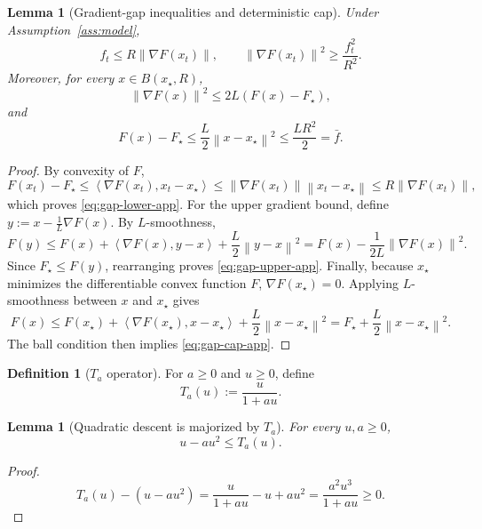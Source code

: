 \documentclass{article}
\newtheorem{lemma}[theorem]{Lemma}
\theoremstyle{definition}
\newtheorem{definition}[theorem]{Definition}
\newcommand{\norm}[1]{\left\lVert #1\right\rVert}
\newcommand{\ip}[2]{\left\langle #1,#2\right\rangle}
\begin{document}
\begin{lemma}[Gradient-gap inequalities and deterministic cap]
\label{lem:gap}
Under Assumption~\ref{ass:model},
\begin{equation}
f_t\le R\norm{\nabla F(x_t)},
\qquad
\norm{\nabla F(x_t)}^2\ge \frac{f_t^2}{R^2}.
\label{eq:gap-lower-app}\end{equation}
Moreover, for every $x\in B(x_\star,R)$,
\begin{equation}
\norm{\nabla F(x)}^2\le 2L(F(x)-F_\star),
\label{eq:gap-upper-app}\end{equation}
and
\begin{equation}
F(x)-F_\star\le \frac{L}{2}\norm{x-x_\star}^2\le \frac{LR^2}{2}=\bar f.
\label{eq:gap-cap-app}\end{equation}
\end{lemma}

\begin{proof}
By convexity of $F$,
\[
F(x_t)-F_\star
\le
\ip{\nabla F(x_t)}{x_t-x_\star}
\le
\norm{\nabla F(x_t)}\norm{x_t-x_\star}
\le
R\norm{\nabla F(x_t)},
\]
which proves \eqref{eq:gap-lower-app}. For the upper gradient bound, define $
y:=x-\frac1L\nabla F(x)$.
By $L$-smoothness,
\[
F(y)\le F(x)+\ip{\nabla F(x)}{y-x}+\frac{L}{2}\norm{y-x}^2
=
F(x)-\frac1{2L}\norm{\nabla F(x)}^2.
\]
Since $F_\star\le F(y)$, rearranging proves \eqref{eq:gap-upper-app}.
Finally, because $x_\star$ minimizes the differentiable convex function $F$,
$\nabla F(x_\star)=0$. Applying $L$-smoothness between $x$ and $x_\star$ gives
\[
F(x)\le F(x_\star)+\ip{\nabla F(x_\star)}{x-x_\star}+\frac{L}{2}\norm{x-x_\star}^2
=
F_\star+\frac{L}{2}\norm{x-x_\star}^2.
\]
The ball condition then implies \eqref{eq:gap-cap-app}.
\end{proof}

\begin{definition}[$T_a$ operator]
For $a\ge 0$ and $u\ge 0$, define
\begin{equation}
T_a(u):=\frac{u}{1+a u}.\end{equation}
\end{definition}

\begin{lemma}[Quadratic descent is majorized by $T_a$]
\label{lem:Ta-majorizes}
For every $u,a\ge 0$,
\[
u-a u^2\le T_a(u).\]
\end{lemma}

\begin{proof}
\[
T_a(u)-(u-a u^2)
=
\frac{u}{1+a u}-u+a u^2
=
\frac{a^2u^3}{1+a u}\ge 0.
\]
\end{proof}
\end{document}
